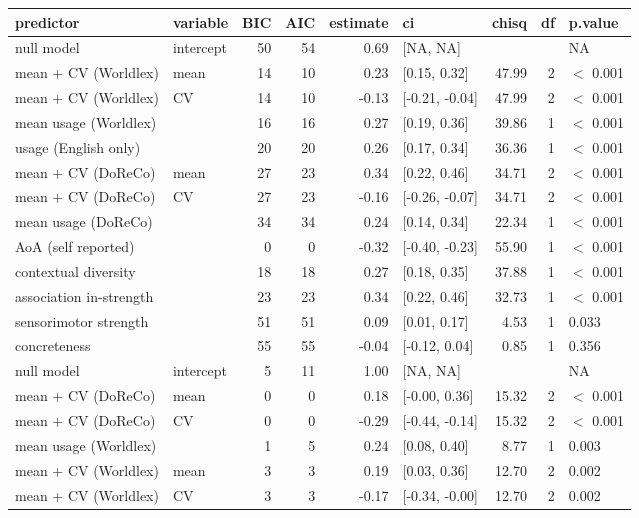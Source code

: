 \begin{table}[ht]
\centering
\begin{tabular}{llrrrlrrl}
  \hline
predictor & variable & BIC & AIC & estimate & ci & chisq & df & p.value \\ 
  \hline
null model & intercept & 50 & 54 & 0.69 & [NA, NA] &  &  & NA \\ 
  mean + CV (Worldlex) & mean & 14 & 10 & 0.23 & [0.15, 0.32] & 47.99 & 2 & $<$ 0.001 \\ 
  mean + CV (Worldlex) & CV & 14 & 10 & -0.13 & [-0.21, -0.04] & 47.99 & 2 & $<$ 0.001 \\ 
  mean usage (Worldlex) &  & 16 & 16 & 0.27 & [0.19, 0.36] & 39.86 & 1 & $<$ 0.001 \\ 
  usage (English only) &  & 20 & 20 & 0.26 & [0.17, 0.34] & 36.36 & 1 & $<$ 0.001 \\ 
  mean + CV (DoReCo) & mean & 27 & 23 & 0.34 & [0.22, 0.46] & 34.71 & 2 & $<$ 0.001 \\ 
  mean + CV (DoReCo) & CV & 27 & 23 & -0.16 & [-0.26, -0.07] & 34.71 & 2 & $<$ 0.001 \\ 
  mean usage (DoReCo) &  & 34 & 34 & 0.24 & [0.14, 0.34] & 22.34 & 1 & $<$ 0.001 \\ 
  AoA (self reported) &  & 0 & 0 & -0.32 & [-0.40, -0.23] & 55.90 & 1 & $<$ 0.001 \\ 
  contextual diversity &  & 18 & 18 & 0.27 & [0.18, 0.35] & 37.88 & 1 & $<$ 0.001 \\ 
  association in-strength &  & 23 & 23 & 0.34 & [0.22, 0.46] & 32.73 & 1 & $<$ 0.001 \\ 
  sensorimotor strength &  & 51 & 51 & 0.09 & [0.01, 0.17] & 4.53 & 1 & 0.033 \\ 
  concreteness &  & 55 & 55 & -0.04 & [-0.12, 0.04] & 0.85 & 1 & 0.356 \\ 
  null model & intercept & 5 & 11 & 1.00 & [NA, NA] &  &  & NA \\ 
  mean + CV (DoReCo) & mean & 0 & 0 & 0.18 & [-0.00, 0.36] & 15.32 & 2 & $<$ 0.001 \\ 
  mean + CV (DoReCo) & CV & 0 & 0 & -0.29 & [-0.44, -0.14] & 15.32 & 2 & $<$ 0.001 \\ 
  mean usage (Worldlex) &  & 1 & 5 & 0.24 & [0.08, 0.40] & 8.77 & 1 & 0.003 \\ 
  mean + CV (Worldlex) & mean & 3 & 3 & 0.19 & [0.03, 0.36] & 12.70 & 2 & 0.002 \\ 
  mean + CV (Worldlex) & CV & 3 & 3 & -0.17 & [-0.34, -0.00] & 12.70 & 2 & 0.002 \\ 

\end{tabular}
\end{table}
